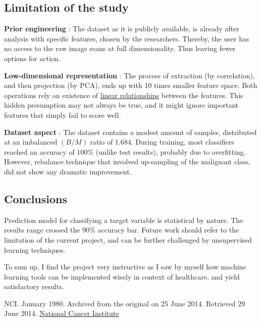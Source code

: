 \documentclass[12pt]{article}
\numberwithin{equation}{section}
\begin{document}
\begin{flushleft}
\subsection{Limitation of the study}

\textbf{Prior engineering} : The dataset as it is publicly available, is already after analysis with specific features, chosen by the researchers. Thereby, the user has no access to the raw image scans at full dimensionality. Thus leaving fewer options for action.


\textbf{Low-dimensional representation} : The process of extraction (by correlation), and then projection (by PCA), ends up with 10 times smaller feature space. Both operations rely on existence of \underline{linear relationships} between the features. This hidden presumption may not always be true, and it might ignore important features that simply fail to score well.

\textbf{Dataset aspect} : The dataset contains a modest amount of samples, distributed at an imbalanced $(B/M)$ ratio of $1.684$. During training, most classifiers reached an accuracy of $100 \%$ (unlike test results), probably due to overfitting. However, rebalance technique that involved up-sampling of the malignant class, did not show any dramatic improvement.

\subsection{Conclusions}

Prediction model for classifying a target variable is statistical by nature. The results range crossed the $90 \%$ accuracy bar. Future work should refer to the limitation of the current project, and can be further challenged by unsupervised learning techniques.

To sum up, I find the project very instructive as I saw by myself how machine learning tools can be implemented wisely in context of healthcare, and yield satisfactory results.

\newpage

\begin{thebibliography}{9} 
\thispagestyle{empty}

 \label{Intro_1}
NCI. January 1980. Archived from the original on 25 June 2014. Retrieved 29 June 2014. \href{https://www.cancer.gov/types/breast}{National Cancer Institute}



\end{thebibliography}
\end{flushleft}
\end{document}
